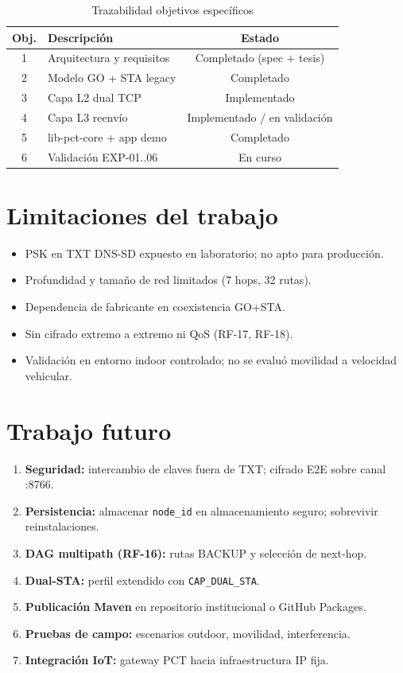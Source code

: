 \begin{table}[htbp]
  \centering
  \caption{Trazabilidad objetivos específicos}
  \label{tab:objetivos-cumplimiento}
  \begin{tabular}{@{}clc@{}}
    \toprule
    \textbf{Obj.} & \textbf{Descripción} & \textbf{Estado} \\
    \midrule
    1 & Arquitectura y requisitos & Completado (spec + tesis) \\
    2 & Modelo GO + STA legacy     & Completado \\
    3 & Capa L2 dual TCP           & Implementado \\
    4 & Capa L3 reenvío            & Implementado / en validación \\
    5 & lib-pct-core + app demo    & Completado \\
    6 & Validación EXP-01..06      & En curso \\
    \bottomrule
  \end{tabular}
\end{table}

\section{Limitaciones del trabajo}
\label{sec:limitaciones-trabajo}

\begin{itemize}
  \item PSK en TXT DNS-SD expuesto en laboratorio; no apto para producción.
  \item Profundidad y tamaño de red limitados (7 hops, 32 rutas).
  \item Dependencia de fabricante en coexistencia GO+STA.
  \item Sin cifrado extremo a extremo ni QoS (RF-17, RF-18).
  \item Validación en entorno indoor controlado; no se evaluó movilidad a velocidad vehicular.
\end{itemize}

\section{Trabajo futuro}
\label{sec:trabajo-futuro}

\begin{enumerate}
  \item \textbf{Seguridad:} intercambio de claves fuera de TXT; cifrado E2E sobre canal :8766.
  \item \textbf{Persistencia:} almacenar \texttt{node\_id} en almacenamiento seguro; sobrevivir reinstalaciones.
  \item \textbf{DAG multipath (RF-16):} rutas BACKUP y selección de next-hop.
  \item \textbf{Dual-STA:} perfil extendido con \texttt{CAP\_DUAL\_STA}.
  \item \textbf{Publicación Maven} en repositorio institucional o GitHub Packages.
  \item \textbf{Pruebas de campo:} escenarios outdoor, movilidad, interferencia.
  \item \textbf{Integración IoT:} gateway PCT hacia infraestructura IP fija.
\end{enumerate}

